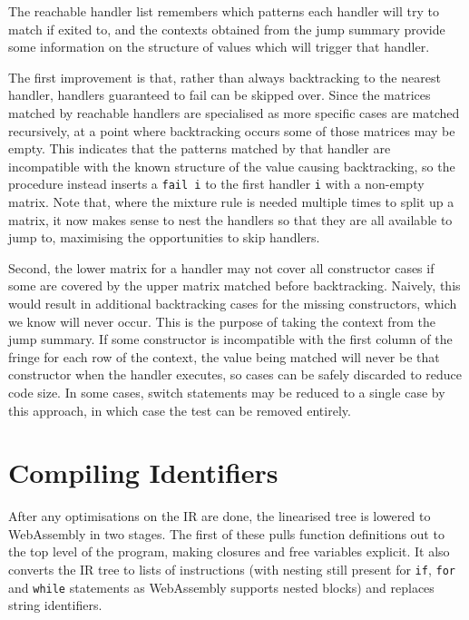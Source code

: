 The reachable handler list remembers which patterns each handler will try to match if exited to, and the contexts obtained from the jump summary provide some information on the structure of values which will trigger that handler. 

The first improvement is that, rather than always backtracking to the nearest handler, handlers guaranteed to fail can be skipped over. Since the matrices matched by reachable handlers are specialised as more specific cases are matched recursively, at a point where backtracking occurs some of those matrices may be empty. This indicates that the patterns matched by that handler are incompatible with the known structure of the value causing backtracking, so the procedure instead inserts a \verb|fail i| to the first handler \verb|i| with a non-empty matrix. Note that, where the mixture rule is needed multiple times to split up a matrix, it now makes sense to nest the handlers so that they are all available to jump to, maximising the opportunities to skip handlers.  

Second, the lower matrix for a handler may not cover all constructor cases if some are covered by the upper matrix matched before backtracking. Naively, this would result in additional backtracking cases for the missing constructors, which we know will never occur. This is the purpose of taking the context from the jump summary. If some constructor is incompatible with the first column of the fringe for each row of the context, the value being matched will never be that constructor when the handler executes, so cases can be safely discarded to reduce code size. In some cases, switch statements may be reduced to a single case by this approach, in which case the test can be removed entirely.



\section{Compiling Identifiers}
After any optimisations on the IR are done, the linearised tree is lowered to WebAssembly in two stages. The first of these pulls function definitions out to the top level of the program, making closures and free variables explicit. It also converts the IR tree to lists of instructions (with nesting still present for \verb|if|, \verb|for| and \verb|while| statements as WebAssembly supports nested blocks) and replaces string identifiers.


